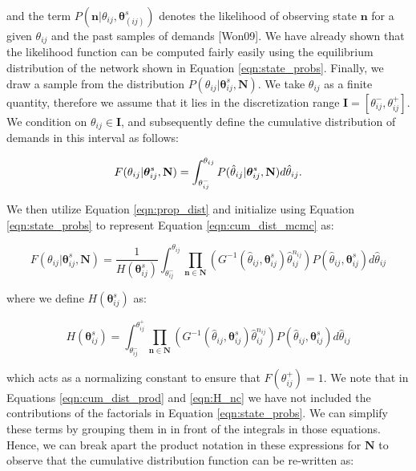 \documentclass[a4paper,11pt,titlepage]{article}
\begin{document}
and the term $P(\mathbf{n}| \theta_{ij}, \bm{\theta}_{(ij)}^{s})$ denotes the likelihood of observing state $\mathbf{n}$ for a given $\theta_{ij}$ and the past samples of demands [Won09]. We have already shown that the likelihood function can be computed fairly easily using the equilibrium distribution of the network shown in Equation \ref{eqn:state_probs}. Finally, we draw a sample from the distribution $P(\theta_{ij}|\bm{\theta}_{ij}^{s},\mathbf{N})$. We take $\theta_{ij}$ as a finite quantity, therefore we assume that it lies in the discretization range $\mathbf{I} = [\theta_{ij}^{-},\theta_{ij}^{+}]$. 
We condition on $\theta_{ij} \in \mathbf{I}$, and subsequently define the cumulative distribution of demands in this interval as follows: 

\begin{equation}
    F(\theta_{ij}|\bm{\theta}_{ij}^{s}, \mathbf{N}) = \int_{\theta_{ij}^{-}}^{\theta_{ij}} P(\hat{\theta}_{ij}|\bm{\theta_}{ij}^{s}, \mathbf{N}) d \hat{\theta}_{ij}.
    \label{eqn:cum_dist_mcmc}
\end{equation}

We then utilize Equation \ref{eqn:prop_dist} and initialize using Equation \ref{eqn:state_probs} to represent Equation \ref{eqn:cum_dist_mcmc} as: 

\begin{equation}
     F(\theta_{ij}|\bm{\theta}_{ij}^{s}, \mathbf{N}) = \frac{1}{H(\bm{\theta}_{ij}^{s})} \int_{\theta_{ij}^{-}}^{\theta_{ij}} \prod_{\mathbf{n} \in \mathbf{N}} \left( G^{-1} (\hat{\theta}_{ij}, \bm{\theta}_{ij}^{s}) \hat{\theta}_{ij}^{n_{ij}} \right) P(\hat{\theta}_{ij}, \bm{\theta}_{ij}^{s}) d \hat{\theta}_{ij}
     \label{eqn:cum_dist_prod}
\end{equation}

where we define $H(\bm{\theta}_{ij}^{s})$ as: 

\begin{equation}
    H(\bm{\theta}_{ij}^{s}) = \int_{\theta_{ij}^{-}}^{\theta_{ij}^{+}} \prod_{\mathbf{n} \in \mathbf{N}} \left( G^{-1} (\hat{\theta}_{ij}, \bm{\theta}_{ij}^{s}) \hat{\theta}_{ij}^{n_{ij}} \right) P(\hat{\theta}_{ij}, \bm{\theta}_{ij}^{s}) d \hat{\theta}_{ij}
    \label{eqn:H_nc}
\end{equation}

which acts as a normalizing constant to ensure that $F(\theta_{ij}^{+}) = 1$. We note that in Equations \ref{eqn:cum_dist_prod} and \ref{eqn:H_nc} we have not included the contributions of the factorials in Equation \ref{eqn:state_probs}. We can simplify these terms by grouping them in in front of the integrals in those equations. Hence, we can break apart the product notation in these expressions for $\mathbf{N}$ to observe that the cumulative distribution function can be re-written as: 
\end{document}
